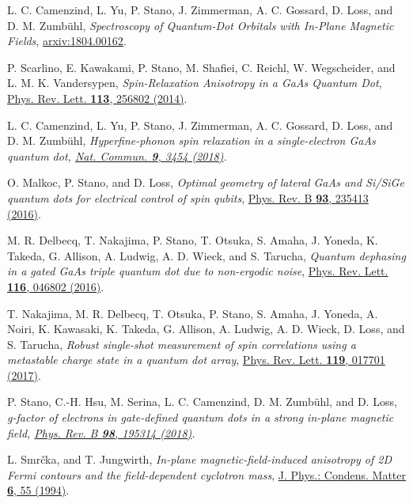 \documentclass[aps,floatfix,twocolumn,showpacs,10pt,nofootinbib]{revtex4-1}
\begin{document}
\begin{thebibliography}{99}
L. C. Camenzind, L. Yu, P. Stano, J. Zimmerman, A. C. Gossard, D. Loss, and D. M. Zumb\"uhl, \textit{Spectroscopy of Quantum-Dot Orbitals with In-Plane Magnetic Fields},
\href{https://arxiv.org/abs/1804.00162}{arxiv:1804.00162}.

P. Scarlino, E. Kawakami, P. Stano, M. Shafiei, C. Reichl, W. Wegscheider, and L. M. K. Vandersypen, \textit{Spin-Relaxation Anisotropy in a GaAs Quantum Dot},
\href{https://doi.org/10.1103/PhysRevLett.113.256802}{Phys. Rev. Lett. {\bf 113}, 256802 (2014)}.

L. C. Camenzind, L. Yu, P. Stano, J. Zimmerman, A. C. Gossard, D. Loss, and D. M. Zumb\"uhl, 
\textit{Hyperfine-phonon spin relaxation in a single-electron GaAs quantum dot,
\href{https://doi.org/10.1038/s41467-018-05879-x}{Nat. Commun. {\bf 9}, 3454 (2018)}.} 

O. Malkoc, P. Stano, and D. Loss, \textit{Optimal geometry of lateral GaAs and Si/SiGe quantum dots for electrical control of spin qubits},
\href{https://doi.org/10.1103/PhysRevB.93.235413}{Phys. Rev. B {\bf 93}, 235413 (2016)}.

M. R. Delbecq, T. Nakajima, P. Stano, T. Otsuka, S. Amaha, J. Yoneda, K. Takeda, G. Allison, A. Ludwig, A. D. Wieck, and S. Tarucha,
\textit{Quantum dephasing in a gated GaAs triple quantum dot due to non-ergodic noise},
\href{https://doi.org/10.1103/PhysRevLett.116.046802}{Phys. Rev. Lett. {\bf 116}, 046802 (2016)}.

T. Nakajima, M. R. Delbecq, T. Otsuka, P. Stano, S. Amaha, J. Yoneda, A. Noiri, K. Kawasaki, K. Takeda, G. Allison, A. Ludwig, A. D. Wieck, D. Loss, and S. Tarucha, \textit{Robust single-shot measurement of spin correlations using a metastable charge state in a quantum dot array},
\href{https://doi.org/10.1103/PhysRevLett.119.017701}{Phys. Rev. Lett. {\bf 119}, 017701 (2017)}.

P. Stano, C.-H. Hsu, M. Serina, L. C. Camenzind, D. M. Zumb\"{u}hl, and D. Loss, \textit{g-factor of electrons in gate-defined quantum dots in a strong in-plane magnetic field,
\href{https://doi.org/10.1103/PysRevB.98.195314}{Phys. Rev. B {\bf 98}, 195314 (2018)}.}

L. Smr\v{c}ka, and T. Jungwirth, \textit{In-plane magnetic-field-induced anisotropy of 2D Fermi contours and the field-dependent cyclotron mass},
\href{https://doi.org/10.1088/0953-8984/6/1/007}{J. Phys.: Condens. Matter {\bf 6}, 55 (1994)}.


\end{thebibliography}
\end{document}
